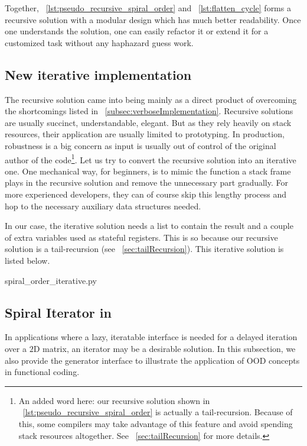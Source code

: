 Together, ~\autoref{lst:pseudo_recursive_spiral_order} and ~\autoref{lst:flatten_cycle}
forms a recursive solution with a modular design which has much better readability.
Once one understands the solution, one can easily refactor it or extend it for a customized task
without any haphazard guess work.


\subsection{New iterative implementation}\label{subsec:newIterative.spiralMatrix}

The recursive solution came into being mainly as a direct product of overcoming the shortcomings
listed in ~\autoref{subsec:verboseImplementation}.
Recursive solutions are usually succinct, understandable, elegant.
But as they rely heavily on stack resources, their application are usually limited to prototyping.
In production, robustness is a big concern as input is usually out of control of the original
author of the code\footnote{An added word here: our recursive solution shown in
~\autoref{lst:pseudo_recursive_spiral_order} is actually a tail-recursion.
Because of this, some compilers may take advantage of this feature and avoid spending stack
resources altogether.
See ~\autoref{sec:tailRecursion} for more details.}.
Let us try to convert the recursive solution into an iterative one.
One mechanical way, for beginners, is to mimic the function a stack frame plays in the recursive
solution and remove the unnecessary part gradually.
For more experienced developers, they can of course skip this lengthy process and hop to the
necessary auxiliary data structures needed.

In our case, the iterative solution needs a list to contain the result and a couple of extra
variables used as stateful registers.
This is so because our recursive solution is a tail-recursion (see ~\autoref{sec:tailRecursion}).
This iterative solution is listed below.

{spiral_order_iterative.py}

\subsection{Spiral Iterator in \python}\label{subsec:spiralIterator}

In applications where a lazy, iteratable interface is needed for a delayed iteration over a $2$D
matrix, an iterator may be a desirable solution.
In this subsection, we also provide the \python generator interface to illustrate the application
of OOD concepts in functional coding.


